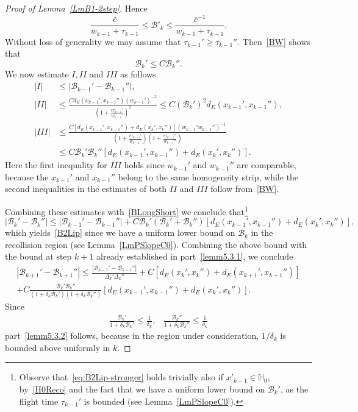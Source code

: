\documentclass[10pt]{amsart}
\theoremstyle{definition}\newtheorem{defi}[theo]{Definition}\newtheorem{rema}[theo]{Remark}\newtheorem{exam}[theo]{Example}\newtheorem{exem}[theo]{Example}\newtheorem{nota}[theo]{Notation}
\newcommand{\inv}{^{-1}}
\newcommand{\homo}{\mathbb{H}}
\newcommand{\cB}{\mathcal{B}}
\newcommand{\pslope}{\mathcal{B}}
\newcommand{\ppPrivate}[2]{#1^{#2}}
\newcommand{\prePrivate}[1]{\ppPrivate{#1}{-}}
\newcommand{\prpslope}{\prePrivate{\pslope}}
\newcommand*\brc{{\bar{c}}}
\newcommand*\RmIII{{{I\!\!I\!\!I}}}
\newcommand*\RmII{{{I\!\!I}}}
\renewcommand{\prpslope}{\cB}
\renewcommand{\prpslope}{\cB}
\renewcommand{\prpslope}{\cB}
\begin{document}
\begin{proof}[Proof of Lemma~\ref{LmB1-2step}]
Hence
\begin{equation}\label{BW}
\frac{\brc}{w_{k-1}+\tau_{k-1}}\leq \cB'_k\leq \frac{\brc^{-1}}{w_{k-1}+\tau_{k-1}}.
\end{equation}
Without loss of generality we may assume that $\tau_{k-1}'\geq \tau_{k-1}''$. Then~\eqref{BW} shows that
\begin{equation}\label{BLongShort}
\cB_k'\leq C \cB_k''.
\end{equation}
We now estimate $I, \RmII$ and $\RmIII$ as follows.
\begin{align*}
|I| &\leq |\cB_{k-1}'-\cB_{k-1}''|,\\
|\RmII|&\leq \frac{C d_E(x_{k-1}', x_{k-1}'') (w_{k-1}')^{-2}}{\left(1+\frac{c \tau_{k-1}'}{w_{k-1}'}\right)^2}
\leq C (\cB_k')^2 d_E(x_{k-1}', x_{k-1}''),\\
|\RmIII|&\leq \frac{C \left[d_E(x_{k-1}', x_{k-1}'')+d_E(x_{k}', x_{k}'')\right] (w_{k-1}' w_{k-1}'')\inv} {\left(1+\frac{c \tau_{k-1}'}{w_{k-1}'}\right)\left(1+\frac{c \tau_{k-1}''}{w_{k-1}''}\right)}\\
&\leq C \cB_k' \cB_k'' \left[d_E(x_{k-1}', x_{k-1}'')+d_E(x_{k}', x_{k}'')\right].
\end{align*}
Here the first inequality for $\RmIII$ holds since $w_{k-1}'$ and $w_{k-1}''$ are comparable, because the $x_{k-1}'$ and $x_{k-1}''$ belong to the same homogeneity strip, while the second inequalities in the estimates of both $\RmII$ and $\RmIII$ follow from~\eqref{BW}.

Combining these estimates with~\eqref{BLongShort} we conclude that\footnote{ Observe that~\eqref{eq:B2Lip-stronger} holds trivially also if $x'_{k-1}\in\homo_{0}$, by~\eqref{H0Reco} and the fact that we have a uniform lower bound on $\cB_k'$, as the flight time $\tau_{k-1}'$ is bounded (see Lemma~\ref{LmPSlopeC0}).}
\begin{equation}\label{eq:B2Lip-stronger}
|\cB_k'-\cB_k''|
\leq
|\cB_{k-1}'-\cB_{k-1}''|+
C \cB_k' (\cB_k'+\cB_k'') \left[d_E(x_{k-1}', x_{k-1}'')+d_E(x_{k}', x_{k}'')\right],
\end{equation}
which yields~\eqref{B2Lip} since we have a uniform lower bound on $\prpslope_k$ in the recollision region (see Lemma~\ref{LmPSlopeC0}). Combining the above bound with the bound at step $k+1$ already established in part~\eqref{lemm5.3.1}, we conclude
\begin{multline*}
|\cB_{k+1}'-\cB_{k+1}''|\leq\frac{|\cB_{k-1}'-\cB_{k-1}''|}{\Delta_{k}'\Delta_{k}''} +C\left[d_E(x_{k}', x_{k}'')+d_E(x_{k+1}', x_{k+1}'')\right] \\
+ C \frac{\cB_k' \cB_k''}{(1+\delta_k\cB_k')(1+\delta_k\cB_k'')}
\left[d_E(x_{k-1}', x_{k-1}'')+d_E(x_{k}', x_{k}'')\right].
\end{multline*}
Since
\begin{align*}
\frac{\cB_k'}{1+\delta_k \cB_k'}\leq \frac{1}{\delta_k}, &\frac{\cB_k''}{1+\delta_k \cB_k''}\leq \frac{1}{\delta_k}
\end{align*}
part~\eqref{lemm5.3.2} follows, because in the region under consideration, $1/\delta_k$ is bounded above uniformly in $k$.
\end{proof}
\end{document}
